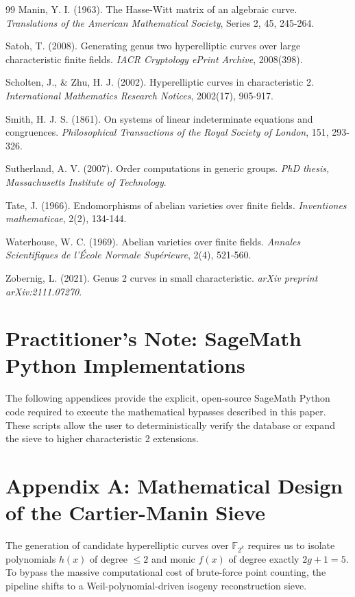 \documentclass[letterpaper, 11pt]{article}
\begin{document}
\begin{thebibliography}{99}
Manin, Y. I. (1963). The Hasse-Witt matrix of an algebraic curve. \textit{Translations of the American Mathematical Society}, Series 2, 45, 245-264.

Satoh, T. (2008). Generating genus two hyperelliptic curves over large characteristic finite fields. \textit{IACR Cryptology ePrint Archive}, 2008(398).

Scholten, J., \& Zhu, H. J. (2002). Hyperelliptic curves in characteristic 2. \textit{International Mathematics Research Notices}, 2002(17), 905-917.

Smith, H. J. S. (1861). On systems of linear indeterminate equations and congruences. \textit{Philosophical Transactions of the Royal Society of London}, 151, 293-326.

Sutherland, A. V. (2007). Order computations in generic groups. \textit{PhD thesis, Massachusetts Institute of Technology}.

Tate, J. (1966). Endomorphisms of abelian varieties over finite fields. \textit{Inventiones mathematicae}, 2(2), 134-144.

Waterhouse, W. C. (1969). Abelian varieties over finite fields. \textit{Annales Scientifiques de l'\'{E}cole Normale Sup\'{e}rieure}, 2(4), 521-560.

Zobernig, L. (2021). Genus 2 curves in small characteristic. \textit{arXiv preprint arXiv:2111.07270}.

\end{thebibliography}

\appendix
\section*{Practitioner's Note: SageMath Python Implementations}
The following appendices provide the explicit, open-source SageMath Python code required to execute the mathematical bypasses described in this paper. These scripts allow the user to deterministically verify the database or expand the sieve to higher characteristic 2 extensions.

\section{Appendix A: Mathematical Design of the Cartier-Manin Sieve}
The generation of candidate hyperelliptic curves over $\mathbb{F}_{2^k}$ requires us to isolate polynomials $h(x)$ of degree $\le 2$ and monic $f(x)$ of degree exactly $2g+1=5$. To bypass the massive computational cost of brute-force point counting, the pipeline shifts to a Weil-polynomial-driven isogeny reconstruction sieve. 
\end{document}
